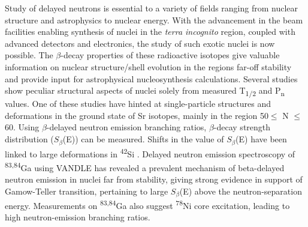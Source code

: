 Study of delayed neutrons is essential to a variety of fields ranging from nuclear structure and astrophysics to nuclear energy. With the advancement in the beam facilities enabling synthesis of nuclei in the \textit{terra incognito} region, coupled with advanced detectors and electronics, the study of such exotic nuclei is now possible. The $\beta$-decay properties of these radioactive isotopes give valuable information on nuclear structure/shell evolution in the regions far-off stability and provide input for astrophysical nucleosynthesis calculations. Several studies show peculiar structural aspects of nuclei solely from measured T\textsubscript{1/2} and P\textsubscript{n} values. One of these studies have hinted at single-particle structures and deformations in the ground state of Sr isotopes, mainly in the region 50$\leq$ N $\leq$ 60. Using $\beta$-delayed neutron emission branching ratios, $\beta$-decay strength distribution ($S_{\beta}$(E)) can be measured. Shifts in the value of $S_{\beta}$(E) have been linked to large deformations in \textsuperscript{42}Si \citep{n28}. Delayed neutron emission spectroscopy of \textsuperscript{83,84}Ga \citep{78Nimiguelmadurga} using VANDLE \citep{VANDLE} has revealed a prevalent mechanism of beta-delayed neutron emission in nuclei far from stability, giving strong evidence in support of Gamow-Teller transition, pertaining to large $S_{\beta}$(E) above the neutron-separation energy. Measurements on \textsuperscript{83,84}Ga also suggest \textsuperscript{78}Ni core excitation, leading to high neutron-emission branching ratios.

 

